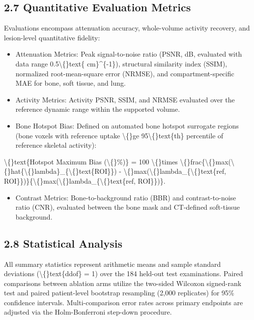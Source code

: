 \documentclass[11pt]{article}
\begin{document}
\subsection*{2.7 Quantitative Evaluation Metrics}
Evaluations encompass attenuation accuracy, whole-volume activity recovery, and lesion-level quantitative fidelity:\par

\begin{itemize}\item Attenuation Metrics: Peak signal-to-noise ratio (PSNR, dB, evaluated with data range 0.5\textbackslash\{\}text\{ cm\}\textasciicircum{}\{-1\}), structural similarity index (SSIM), normalized root-mean-square error (NRMSE), and compartment-specific MAE for bone, soft tissue, and lung.\end{itemize}
\begin{itemize}\item Activity Metrics: Activity PSNR, SSIM, and NRMSE evaluated over the reference dynamic range within the supported volume.\end{itemize}
\begin{itemize}\item Bone Hotspot Bias: Defined on automated bone hotspot surrogate regions (bone voxels with reference uptake \textbackslash\{\}ge 95\textbackslash\{\}text\{th\} percentile of reference skeletal activity):\end{itemize}
  \textbackslash\{\}text\{Hotspot Maximum Bias (\textbackslash\{\}\%)\} = 100 \textbackslash\{\}times \textbackslash\{\}frac\{\textbackslash\{\}max(\textbackslash\{\}hat\{\textbackslash\{\}lambda\}\_\{\textbackslash\{\}text\{ROI\}\}) - \textbackslash\{\}max(\textbackslash\{\}lambda\_\{\textbackslash\{\}text\{ref, ROI\}\})\}\{\textbackslash\{\}max(\textbackslash\{\}lambda\_\{\textbackslash\{\}text\{ref, ROI\}\})\}.\par

\begin{itemize}\item Contrast Metrics: Bone-to-background ratio (BBR) and contrast-to-noise ratio (CNR), evaluated between the bone mask and CT-defined soft-tissue background.\end{itemize}
\subsection*{2.8 Statistical Analysis}
All summary statistics represent arithmetic means and sample standard deviations (\textbackslash\{\}text\{ddof\} = 1) over the 184 held-out test examinations. Paired comparisons between ablation arms utilize the two-sided Wilcoxon signed-rank test and paired patient-level bootstrap resampling (2,000 replicates) for 95\% confidence intervals. Multi-comparison error rates across primary endpoints are adjusted via the Holm-Bonferroni step-down procedure.\par
\end{document}
